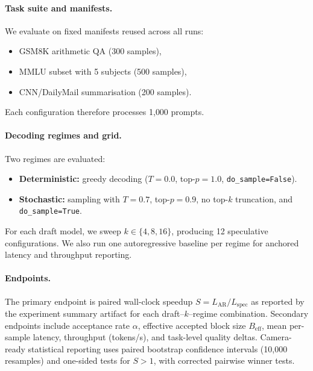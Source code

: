 \paragraph{Task suite and manifests.}
We evaluate on fixed manifests reused across all runs:
\begin{itemize}
    \item GSM8K arithmetic QA (300 samples),
    \item MMLU subset with 5 subjects (500 samples),
    \item CNN/DailyMail summarisation (200 samples).
\end{itemize}
Each configuration therefore processes 1{,}000 prompts.

\paragraph{Decoding regimes and grid.}
Two regimes are evaluated:
\begin{itemize}
    \item \textbf{Deterministic:} greedy decoding ($T{=}0.0$, top-$p{=}1.0$, \texttt{do\_sample=False}).
    \item \textbf{Stochastic:} sampling with $T{=}0.7$, top-$p{=}0.9$, no top-$k$ truncation, and \texttt{do\_sample=True}.
\end{itemize}
For each draft model, we sweep $k\in\{4,8,16\}$, producing
12 speculative configurations. We also run one autoregressive baseline per
regime for anchored latency and throughput reporting.

\paragraph{Endpoints.}
The primary endpoint is paired wall-clock speedup
$S = L_{\text{AR}}/L_{\text{spec}}$ as reported by the experiment summary
artifact for each draft--$k$--regime combination.
Secondary endpoints include acceptance rate $\alpha$, effective accepted block
size $B_{\text{eff}}$, mean per-sample latency, throughput (tokens/s), and
task-level quality deltas. Camera-ready statistical reporting uses paired
bootstrap confidence intervals (10{,}000 resamples) and one-sided tests for
$S{>}1$, with corrected pairwise winner tests.
